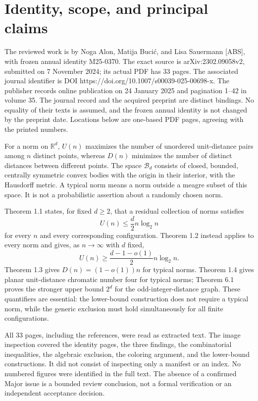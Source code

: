\documentclass[10pt]{article}
\begin{document}
\section*{Identity, scope, and principal claims}
The reviewed work is by Noga Alon, Matija Bucić, and Lisa Sauermann [ABS], with frozen annual identity M25-0370. The exact source is arXiv:2302.09058v2, submitted on 7 November 2024; its actual PDF has 33 pages. The associated journal identifier is DOI https://doi.org/10.1007/s00039-025-00698-x. The publisher records online publication on 24 January 2025 and pagination 1–42 in volume 35. The journal record and the acquired preprint are distinct bindings. No equality of their texts is assumed, and the frozen annual identity is not changed by the preprint date. Locations below are one-based PDF pages, agreeing with the printed numbers.\par
For a norm on \(\mathbb R^d\), \(U(n)\) maximizes the number of unordered unit-distance pairs among \(n\) distinct points, whereas \(D(n)\) minimizes the number of distinct distances between different points. The space \(\mathcal B_d\) consists of closed, bounded, centrally symmetric convex bodies with the origin in their interior, with the Hausdorff metric. A typical norm means a norm outside a meagre subset of this space. It is not a probabilistic assertion about a randomly chosen norm.\par
Theorem 1.1 states, for fixed \(d\ge2\), that a residual collection of norms satisfies \[U(n)\le \frac d2 n\log_2 n\] for every \(n\) and every corresponding configuration. Theorem 1.2 instead applies to every norm and gives, as \(n\to\infty\) with \(d\) fixed, \[U(n)\ge \frac{d-1-o(1)}2 n\log_2 n.\] Theorem 1.3 gives \(D(n)=(1-o(1))n\) for typical norms. Theorem 1.4 gives planar unit-distance chromatic number four for typical norms; Theorem 6.1 proves the stronger upper bound \(2^d\) for the odd-integer-distance graph. These quantifiers are essential: the lower-bound construction does not require a typical norm, while the generic exclusion must hold simultaneously for all finite configurations.\par
All 33 pages, including the references, were read as extracted text. The image inspection covered the identity pages, the three findings, the combinatorial inequalities, the algebraic exclusion, the coloring argument, and the lower-bound constructions. It did not consist of inspecting only a manifest or an index. No numbered figures were identified in the full text. The absence of a confirmed Major issue is a bounded review conclusion, not a formal verification or an independent acceptance decision.\par
\end{document}
